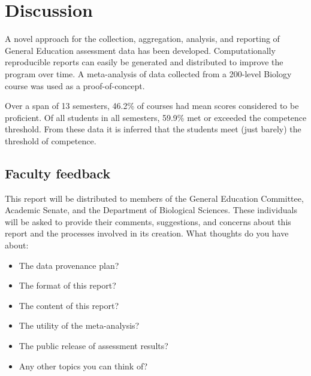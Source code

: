 \documentclass[fleqn,10pt]{SelfArx}\usepackage[]{graphicx}\usepackage[]{color}
\begin{document}
\section{Discussion}

A novel approach for the collection, aggregation, analysis, and reporting of General Education assessment data has been developed. Computationally reproducible reports can easily be generated and distributed to improve the program over time. A meta-analysis of data collected from a 200-level Biology course was used as a proof-of-concept.

Over a span of 13 semesters, 46.2\% of courses had mean scores considered to be proficient. Of all students in all semesters, 59.9\% met or exceeded the competence threshold. From these data it is inferred that the students meet (just barely) the threshold of competence.

\subsection{Faculty feedback}
This report will be distributed to members of the General Education Committee, Academic Senate, and the Department of Biological Sciences.  These individuals will be asked to provide their comments, suggestions, and concerns about this report and the processes involved in its creation. What thoughts do you have about:

\begin{itemize}[noitemsep]
\item The data provenance plan?
\item The format of this report?
\item The content of this report?
\item The utility of the meta-analysis?
\item The public release of assessment results?
\item Any other topics you can think of?
\end{itemize}
\end{document}
